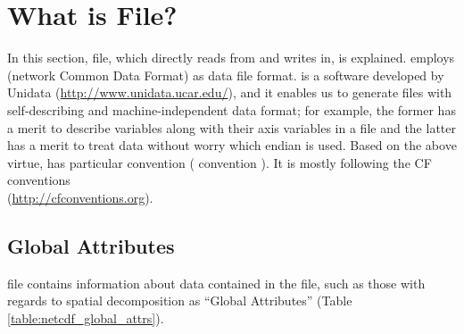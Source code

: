 \section{What is \scalenetcdf File?} \label{sec:netcdf}

In this section, \scalenetcdf file, which \scalelib directly reads from and writes in, is explained.
\scalelib employs \netcdf (network Common Data Format) as data file format.
\Netcdf is a software developed by Unidata (\url{http://www.unidata.ucar.edu/}),
and it enables us to generate files with self-describing and machine-independent data format;
for example, the former has a merit to describe variables along with their axis variables in a file and
the latter has a merit to treat data without worry which endian is used.
Based on the above virtue, \scalelib has particular convention ( \scalenetcdf convention ).
It is mostly following the CF conventions \\ (\url{http://cfconventions.org}).


\subsection{Global Attributes}
\scalenetcdf file contains information about data contained in the file,
such as those with regards to spatial decomposition as ``Global Attributes'' (Table \ref{table:netcdf_global_attrs}).

